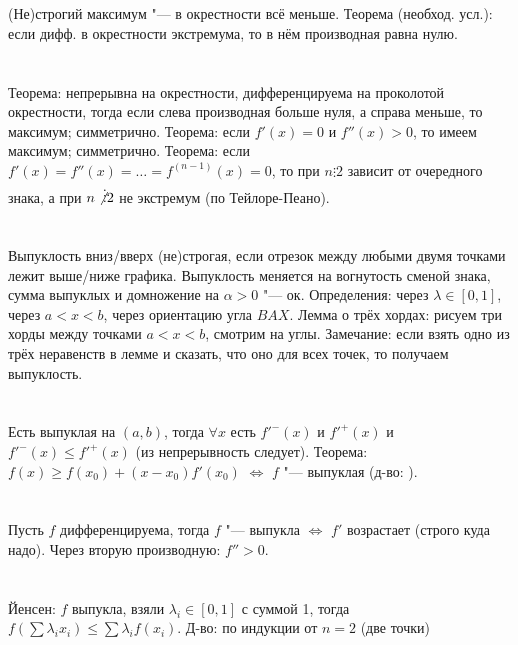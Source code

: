 \section{} %
(Не)строгий максимум "--- в окрестности всё меньше. Теорема (необход. усл.): если дифф. в окрестности
экстремума, то в нём производная равна нулю.

\section{} %
Теорема: непрерывна на окрестности, дифференцируема на проколотой окрестности,
тогда если слева производная больше нуля, а справа меньше, то максимум; симметрично.
Теорема: если $f'(x)=0$ и $f''(x)>0$, то имеем максимум; симметрично.
Теорема: если $f'(x)=f''(x)=\dots=f^{(n-1)}(x)=0$, то при $n \vdots 2$ зависит от
очередного знака, а при $n \not\vdots 2$ не экстремум (по Тейлоре-Пеано).

\section{} %
Выпуклость вниз/вверх (не)строгая, если отрезок между любыми двумя точками лежит выше/ниже графика.
Выпуклость меняется на вогнутость сменой знака, сумма выпуклых и домножение на $\alpha > 0$ "--- ок.
Определения: через $\lambda \in [0,1]$, через $a < x < b$, через ориентацию угла $BAX$.
Лемма о трёх хордах: рисуем три хорды между точками $a<x<b$, смотрим на углы. Замечание:
если взять одно из трёх неравенств в лемме и сказать, что оно для всех точек, то получаем выпуклость.

\section{} %
Есть выпуклая на $(a,b)$, тогда $\forall x$ есть $f'^-(x)$ и $f'^+(x)$ и $f'^-(x)\le f'^+(x)$
(из непрерывность следует). Теорема: $f(x) \ge f(x_0) + (x-x_0)f'(x_0)$ $\iff$ $f$ "--- выпуклая (д-во: \TODO).

\section{} %
Пусть $f$ дифференцируема, тогда $f$ "--- выпукла $\iff$ $f'$ возрастает (строго куда надо).
Через вторую производную: $f''>0$.

\section{} %
Йенсен: $f$ выпукла, взяли $\lambda_i \in [0,1]$ с суммой 1, тогда $f\left(\sum\lambda_i x_i\right) \le \sum\lambda_if(x_i)$.
Д-во: по индукции от $n=2$ (две точки)

